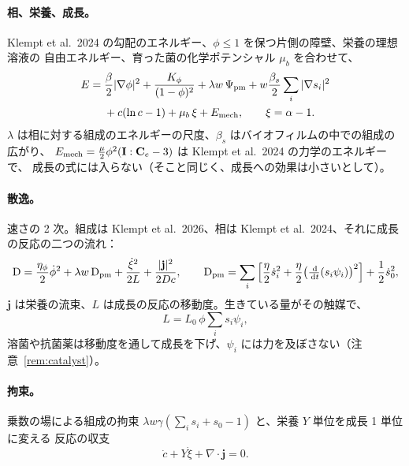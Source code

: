 \documentclass[11pt,a4paper]{article}
\theoremstyle{definition}
\newcommand{\dd}{\,\mathrm{d}}
\newcommand{\D}{\mathrm{D}}
\newcommand{\living}{\textstyle\sum_i s_i\psi_i}
\begin{document}
\paragraph{相、栄養、成長。} Klempt et al.\ 2024 の勾配のエネルギー、$\phi\le1$ を保つ片側の障壁、栄養の理想溶液の
自由エネルギー、育った菌の化学ポテンシャル $\mu_b$ を合わせて、
\begin{equation}
\begin{aligned}
E={}&\frac{\beta}{2}|\nabla\phi|^2+\frac{K_\phi}{(1-\phi)^2}
+\lambda w\,\Psi_{\rm pm}+w\frac{\beta_s}{2}\sum_i|\nabla s_i|^2\\
&+c(\ln c-1)+\mu_b\,\xi+E_{\rm mech},\qquad \xi=\alpha-1 .
\end{aligned}
\label{eq:E}
\end{equation}
$\lambda$ は相に対する組成のエネルギーの尺度、$\beta_s$ はバイオフィルムの中での組成の広がり、
$E_{\rm mech}=\tfrac{\mu}{2}\phi^2(\mathbf I:\mathbf C_e-3)$ は Klempt et al.\ 2024 の力学のエネルギーで、
成長の式には入らない（そこと同じく、成長への効果は小さいとして）。

\paragraph{散逸。} 速さの 2 次。組成は Klempt et al.\ 2026、相は Klempt et al.\ 2024、それに成長の反応の二つの流れ：
\begin{equation}
\D=\frac{\eta_\phi}{2}\dot\phi^2+\lambda w\,\D_{\rm pm}+\frac{\dot\xi^2}{2L}+\frac{|\mathbf j|^2}{2Dc},\qquad
\D_{\rm pm}=\sum_i\Big[\frac{\eta}{2}\dot s_i^2+\frac{\eta}{2}\big(\tfrac{\dd}{\dd t}(s_i\psi_i)\big)^2\Big]+\frac12\dot s_0^2 ,
\label{eq:D}
\end{equation}
$\mathbf j$ は栄養の流束、$L$ は成長の反応の移動度。生きている量がその触媒で、
\begin{equation}
L=L_0\,\phi\living ,
\label{eq:L}
\end{equation}
溶菌や抗菌薬は移動度を通して成長を下げ、$\psi_i$ には力を及ぼさない（注意~\ref{rem:catalyst}）。

\paragraph{拘束。} 乗数の場による組成の拘束 $\lambda w\gamma(\sum_is_i+s_0-1)$ と、栄養 $Y$ 単位を成長 1 単位に変える
反応の収支
\begin{equation}
\dot c+Y\dot\xi+\nabla\!\cdot\mathbf j=0 .
\label{eq:balance}
\end{equation}
\end{document}

